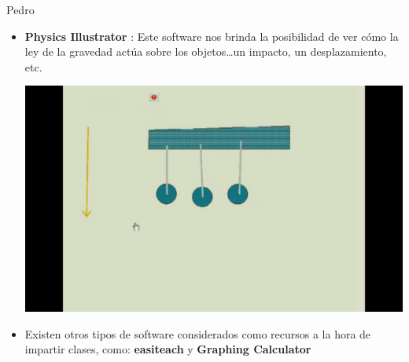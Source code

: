 \begin{opin}{\pedrocolor}{Pedro}
\begin{itemize}
\begin{itemize}
 
\item \textbf{Physics Illustrator} : Este software nos brinda la posibilidad de ver cómo la ley de la gravedad actúa sobre los objetos…un impacto, un desplazamiento, etc. 

 
\begin{minipage}[hbtp]{1.0\linewidth}
\vspace{0.3cm}
\centering
\includegraphics[scale=0.2]{img/pdipedro5.png}
\vspace{0.3cm}
\end{minipage}

\item Existen otros tipos de software considerados como recursos a la hora de impartir clases, como:  \textbf{easiteach} y \textbf{Graphing Calculator}
 
\end{itemize}
\end{itemize}
\end{opin}

